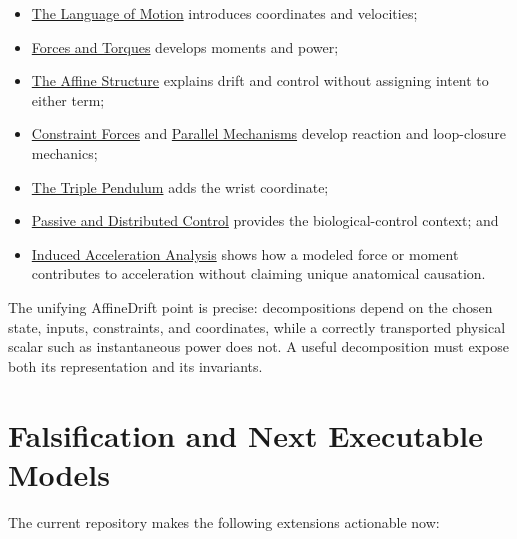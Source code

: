 \documentclass[
  letterpaper,
]{report}
\providecommand{\tightlist}{%
  \setlength{\itemsep}{0pt}\setlength{\parskip}{0pt}}
\begin{document}
\begin{itemize}
\tightlist
\item
  \href{https://affinedrift.com/articles/The_Physics_of_Golf/quarto/ch02_language_of_motion.html}{The
  Language of Motion} introduces coordinates and velocities;
\item
  \href{https://affinedrift.com/articles/The_Physics_of_Golf/quarto/ch04_forces_and_torques.html}{Forces
  and Torques} develops moments and power;
\item
  \href{https://affinedrift.com/articles/The_Physics_of_Golf/quarto/ch05_affine_structure.html}{The
  Affine Structure} explains drift and control without assigning intent
  to either term;
\item
  \href{https://affinedrift.com/articles/The_Physics_of_Golf/quarto/ch07_constraint_forces.html}{Constraint
  Forces} and
  \href{https://affinedrift.com/articles/The_Physics_of_Golf/quarto/ch09_parallel_mechanisms.html}{Parallel
  Mechanisms} develop reaction and loop-closure mechanics;
\item
  \href{https://affinedrift.com/articles/The_Physics_of_Golf/quarto/ch08_triple_pendulum.html}{The
  Triple Pendulum} adds the wrist coordinate;
\item
  \href{https://affinedrift.com/articles/The_Physics_of_Golf/quarto/ch27_passive_distributed_control.html}{Passive
  and Distributed Control} provides the biological-control context; and
\item
  \href{https://affinedrift.com/articles/The_Physics_of_Golf/quarto/ch30b_induced_acceleration.html}{Induced
  Acceleration Analysis} shows how a modeled force or moment contributes
  to acceleration without claiming unique anatomical causation.
\end{itemize}

The unifying AffineDrift point is precise: decompositions depend on the
chosen state, inputs, constraints, and coordinates, while a correctly
transported physical scalar such as instantaneous power does not. A
useful decomposition must expose both its representation and its
invariants.

\section{Falsification and Next Executable
Models}\label{falsification-and-next-executable-models}

The current repository makes the following extensions actionable now:
\end{document}
